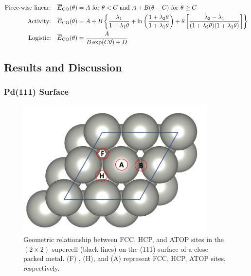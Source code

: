 \documentclass[11pt]{article}
\begin{document}
\begin{align*}
\text{Piece-wise linear:} & \quad \overline{E}_{\ce{CO}}(\theta) = A \text{ for }\theta<C\text{  and }A+B(\theta-C)\text{ for } \theta\geq C\\
\text{Activity:} & \quad \overline{E}_{\ce{CO}}(\theta)  =A+B\left\{\frac{\lambda_{1}}{1+\lambda_{1}\theta}+\ln\left(\frac{1+\lambda_{2}\theta}{1+\lambda_{1}\theta}\right)+\theta\left[\frac{\lambda_{2}-\lambda_{1}}{(1+\lambda_{2}\theta)(1+\lambda_{1}\theta)}\right]\right\}\\
\text{Logistic:} & \quad \overline{E}_{\ce{CO}}(\theta)  =\frac{A}{B \exp (C \theta ) + D}\\
\end{align*}
\clearpage

\subsection*{Results and Discussion}
\label{result}
\subsubsection*{Pd(111) Surface}
\begin{figure} [ht]
\centering
\includegraphics[width=10cm]{Figure/Pd.pdf}
\caption{Geometric relationship between FCC, HCP, and ATOP sites in the $(2 \times 2)$ supercell (black lines) on the (111) surface of a close-packed metal. (F) , (H), and (A) represent FCC, HCP,  ATOP sites, respectively.}
\label{Pd}
\end{figure}

\clearpage
\end{document}
